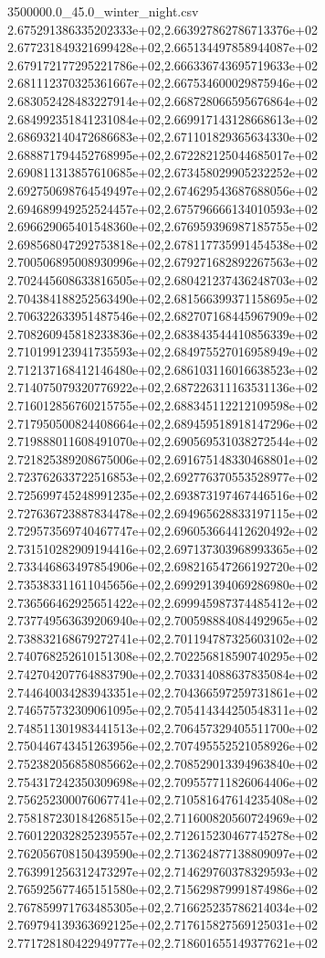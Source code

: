\begin{filecontents*}{3500000.0_45.0_winter_night.csv}
2.675291386335202333e+02,2.663927862786713376e+02
2.677231849321699428e+02,2.665134497858944087e+02
2.679172177295221786e+02,2.666336743695719633e+02
2.681112370325361667e+02,2.667534600029875946e+02
2.683052428483227914e+02,2.668728066595676864e+02
2.684992351841231084e+02,2.669917143128668613e+02
2.686932140472686683e+02,2.671101829365634330e+02
2.688871794452768995e+02,2.672282125044685017e+02
2.690811313857610685e+02,2.673458029905232252e+02
2.692750698764549497e+02,2.674629543687688056e+02
2.694689949252524457e+02,2.675796666134010593e+02
2.696629065401548360e+02,2.676959396987185755e+02
2.698568047292753818e+02,2.678117735991454538e+02
2.700506895008930996e+02,2.679271682892267563e+02
2.702445608633816505e+02,2.680421237436248703e+02
2.704384188252563490e+02,2.681566399371158695e+02
2.706322633951487546e+02,2.682707168445967909e+02
2.708260945818233836e+02,2.683843544410856339e+02
2.710199123941735593e+02,2.684975527016958949e+02
2.712137168412146480e+02,2.686103116016638523e+02
2.714075079320776922e+02,2.687226311163531136e+02
2.716012856760215755e+02,2.688345112212109598e+02
2.717950500824408664e+02,2.689459518918147296e+02
2.719888011608491070e+02,2.690569531038272544e+02
2.721825389208675006e+02,2.691675148330468801e+02
2.723762633722516853e+02,2.692776370553528977e+02
2.725699745248991235e+02,2.693873197467446516e+02
2.727636723887834478e+02,2.694965628833197115e+02
2.729573569740467747e+02,2.696053664412620492e+02
2.731510282909194416e+02,2.697137303968993365e+02
2.733446863497854906e+02,2.698216547266192720e+02
2.735383311611045656e+02,2.699291394069286980e+02
2.736566462925651422e+02,2.699945987374485412e+02
2.737749563639206940e+02,2.700598884084492965e+02
2.738832168679272741e+02,2.701194787325603102e+02
2.740768252610151308e+02,2.702256818590740295e+02
2.742704207764883790e+02,2.703314088637835084e+02
2.744640034283943351e+02,2.704366597259731861e+02
2.746575732309061095e+02,2.705414344250548311e+02
2.748511301983441513e+02,2.706457329405511700e+02
2.750446743451263956e+02,2.707495552521058926e+02
2.752382056858085662e+02,2.708529013394963840e+02
2.754317242350309698e+02,2.709557711826064406e+02
2.756252300076067741e+02,2.710581647614235408e+02
2.758187230184268515e+02,2.711600820560724969e+02
2.760122032825239557e+02,2.712615230467745278e+02
2.762056708150439590e+02,2.713624877138809097e+02
2.763991256312473297e+02,2.714629760378329593e+02
2.765925677465151580e+02,2.715629879991874986e+02
2.767859971763485305e+02,2.716625235786214034e+02
2.769794139363692125e+02,2.717615827569125031e+02
2.771728180422949777e+02,2.718601655149377621e+02

\end{filecontents*}
